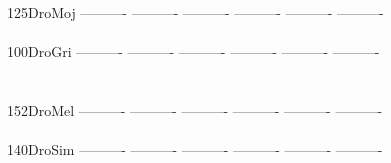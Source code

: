 \documentclass[11pt,twoside,reqno,a4paper]{article}
\begin{document}
{125\hspace*{2\charwidth}DroMoj	----------	----------	----------	----------	----------	----------	\\
\hspace*{5\charwidth}\hspace*{7\charwidth}\hspace*{1\charwidth}\hspace*{1\charwidth}\hspace*{1\charwidth}\hspace*{1\charwidth}\hspace*{1\charwidth}\hspace*{1\charwidth}\\
100\hspace*{2\charwidth}DroGri	----------	----------	----------	----------	----------	----------	\\
\hspace*{5\charwidth}\hspace*{7\charwidth}\hspace*{1\charwidth}\hspace*{1\charwidth}\hspace*{1\charwidth}\hspace*{1\charwidth}\hspace*{1\charwidth}\hspace*{1\charwidth}\\
\\
152\hspace*{2\charwidth}DroMel	----------	----------	----------	----------	----------	----------	\\
\hspace*{5\charwidth}\hspace*{7\charwidth}\hspace*{1\charwidth}\hspace*{1\charwidth}\hspace*{1\charwidth}\hspace*{1\charwidth}\hspace*{1\charwidth}\hspace*{1\charwidth}\\
140\hspace*{2\charwidth}DroSim	----------	----------	----------	----------	----------	----------	\\
\hspace*{5\charwidth}\hspace*{7\charwidth}\hspace*{1\charwidth}\hspace*{1\charwidth}\hspace*{1\charwidth}\hspace*{1\charwidth}\hspace*{1\charwidth}\hspace*{1\charwidth}\\
}
\end{document}

